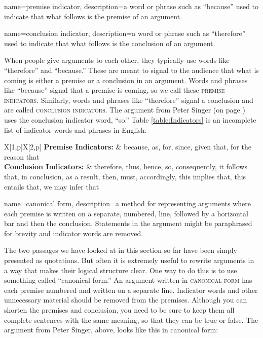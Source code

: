 {
name=premise indicator,
description={a word or phrase such as ``because'' used to indicate that what follows is the premise of an argument.}
}

{
name=conclusion indicator,
description={a word or phrase such as ``therefore'' used to indicate that what follows is the conclusion of an argument.}
}

When people give arguments to each other, they typically use words like ``therefore'' and ``because.'' These are meant to signal to the audience that what is coming is either a premise or a conclusion in an argument. Words and phrases like ``because'' signal that a premise is coming, so we call these \textsc{\glspl{premise indicator}}. Similarly, words and phrases like ``therefore'' signal a conclusion and are called \textsc{\glspl{conclusion indicator}}. The argument from Peter Singer (on page \pageref{singer_quote}) uses the conclusion indicator word, ``so.'' Table \ref{table:Indicators} is an incomplete list of indicator words and phrases in English.


\begin{table}
\begin{mdframed}[style=mytablebox]

\begin{longtabu}{X[1,p]X[2,p]}
\textbf{Premise Indicators:} & because, as, for, since, given that, for the reason that \\
\textbf{Conclusion Indicators:} & therefore, thus, hence, so, consequently, it follows that, in conclusion, as a result, then, must, accordingly, this implies that, this entails that, we may infer that \\
\end{longtabu}
\end{mdframed}
\caption{Premise and Conclusion Indicators.}
\label{table:Indicators}
\end{table}

{
name=canonical form,
description={a method for representing arguments where each premise is written on a separate, numbered, line, followed by a horizontal bar and then the conclusion. Statements in the argument might be paraphrased for brevity and indicator words are removed.}
}


The two passages we have looked at in this section so far have been simply presented as quotations. But often it is extremely useful to rewrite arguments in a way that makes their logical structure clear. One way to do this is to use something called ``canonical form.''   An argument written in \textsc{\gls{canonical form}} \label{def:canonical_form}has each premise numbered and written on a separate line. Indicator words and other unnecessary material should be removed from the premises. Although you can shorten the premises and conclusion, you need to be sure to keep them all complete sentences with the same meaning, so that they can be true or false. The argument from Peter Singer, above, looks like this in canonical form:

